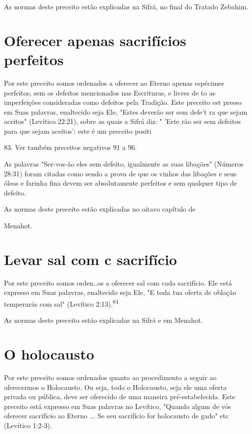 As normas deste preceito estão explicadas na Sifrá, no final do Tra­tado
Zebahim.

\section{Oferecer apenas sacrifícios perfeitos}

Por este preceito somos ordenados a oferecer ao Eterno apenas espé­cimes
perfeitos, sem os defeitos mencionados nas Escrituras, e livres de to as
imperfeições consideradas como defeitos pela Tradição. Este preceito est
presso em Suas palavras, enaltecido seja Ele, "Estes deverão ser sem
defe't ra que sejam aceitos" (Levítico 22:21), sobre as quais a Sifrá
diz: " 'Este rão ser sem defeitos para que sejam aceitos': este é um
preceito positi

83. Ver também preceitos negativos 91 a 96.



As palavras "Ser-vos-ão eles sem defeito, igualmente as suas libações"
(Números 28:31) foram citadas como sendo a prova de que os vinhos das
liba­ções e seus óleos e farinha fina devem ser absolutamente perfeitos
e sem qual­quer tipo de defeito.


As normas deste preceito estão explicadas no oitavo capítulo de


Menahot.

\section{Levar sal com c sacrifício}

Por este preceito somos orden..os a oferecer sal com cada sacrifí­cio.
Ele está expresso em Suas palavras, enaltecido seja Ele, "E toda tua
oferta de oblação temperarás com sal" (Levítico
2:13).\textsuperscript{84}


As normas deste preceito estão explicadas na Sifrá e em Menahot.


\section{O holocausto}

Por este preceito somos ordenados quanto ao procedimento a se­guir ao
oferecermos o Holocausto. Ou seja, todo o Holocausto, seja ele uma
oferta privada ou pública, deve ser oferecido de uma maneira
pré-estabelecida. Este preceito está expresso em Suas palavras no
Levítico, "Quando algum de vós oferecer sacrifício ao Eterno ... Se seu
sacrifício for holocausto de gado" etc (Levítico 1:2-3).

